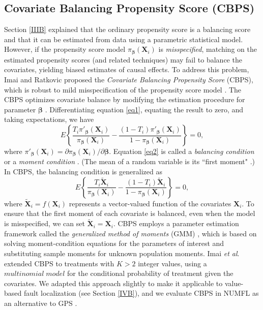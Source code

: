 \subsection{Covariate Balancing Propensity Score (CBPS)}\label{IIID}
Section \ref{IIIB} explained that the ordinary propensity score is a balancing score and that it can be estimated from data using a parametric statistical model.  However, if the propensity score model ${\pi _{\pmb \beta} }({\pmb{X}_i})$  is {\it misspecified}, matching on the estimated propensity scores (and related techniques) may fail to balance the covariates, yielding biased estimates of causal effects. To address this problem, Imai and Ratkovic proposed the {\it Covariate Balancing Propensity Score} (CBPS), which is robust to mild misspecification of the propensity score model \cite{Imai2014}.
The CBPS optimizes covariate balance by modifying the estimation procedure for parameter $\pmb{\beta}$ .  Differentiating equation \eqref{eq1}, equating the result to zero, and taking expectations, we have \cite{Imai2014}
\begin{equation}\label{eq2}
E\left\{ {\frac{{{T_i}{{\pi '}_{\pmb \beta} }({\pmb{X}_i})}}{{{\pi _{\pmb \beta} }({\pmb{X}_i})}} - \frac{{(1 - {T_i}){{\pi '}_{\pmb \beta} }({\pmb{X}_i})}}{{1 - {\pi _{\pmb \beta} }({\pmb{X}_i})}}} \right\} = 0,
\end{equation}
where ${\pi '_{\pmb \beta} }({\pmb{X}_i}) = \partial {\pi _{\pmb \beta} }({\pmb{X}_i})/\partial \pmb{\beta}$.  Equation \eqref{eq2} is called a {\it balancing condition} or a {\it moment condition} \cite{Imai2014}.  (The mean of a random variable is its ``first moment" \cite{Rosenblueth1981}.)  In CBPS, the balancing condition is generalized as
\begin{equation}\label{eq3}
E\left\{ {\frac{{{T_i}{{\tilde {\pmb X}}_i}}}{{{\pi _{\pmb \beta} }({\pmb{X}_i})}} - \frac{{(1 - {T_i}){{\tilde {\pmb X}}_i}}}{{1 - {\pi _{\pmb \beta} }({\pmb{X}_i})}}} \right\} = 0,
\end{equation}
where ${\tilde {\pmb X}_i} = f({\pmb{X}_i})$ represents a vector-valued function of the covariates $\pmb{X}_i$. To ensure that the first moment of each covariate is balanced, even when the model is misspecified, we can set ${\tilde {\pmb X}_i} = {\pmb{X}_i}$. CBPS employs a parameter estimation framework called the {\it generalized method of moments} (GMM) \cite{Hansen1982}, which is based on solving moment-condition equations for the parameters of interest and substituting sample moments for unknown population moments. Imai {\it et al}. extended CBPS to treatments with $K>2$ integer values, using a $multinomial\;model$ for the conditional probability of treatment given the covariates. We adapted this approach slightly to make it applicable to value-based fault localization (see Section \ref{IVB}), and we evaluate CBPS in NUMFL as an alternative to GPS .


